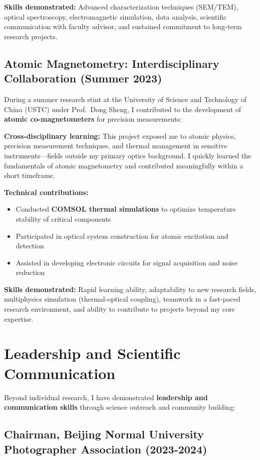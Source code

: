 \documentclass[11pt,a4paper]{article}
\begin{document}
\textbf{Skills demonstrated:} Advanced characterization techniques (SEM/TEM), optical spectroscopy, electromagnetic simulation, data analysis, scientific communication with faculty advisor, and sustained commitment to long-term research projects.

\subsection{Atomic Magnetometry: Interdisciplinary Collaboration (Summer 2023)}

During a summer research stint at the University of Science and Technology of China (USTC) under Prof.~Dong Sheng, I contributed to the development of \textbf{atomic co-magnetometers} for precision measurements:

\textbf{Cross-disciplinary learning:} This project exposed me to atomic physics, precision measurement techniques, and thermal management in sensitive instruments—fields outside my primary optics background. I quickly learned the fundamentals of atomic magnetometry and contributed meaningfully within a short timeframe.

\textbf{Technical contributions:}
\begin{itemize}
    \item Conducted \textbf{COMSOL thermal simulations} to optimize temperature stability of critical components
    \item Participated in optical system construction for atomic excitation and detection
    \item Assisted in developing electronic circuits for signal acquisition and noise reduction
\end{itemize}

\textbf{Skills demonstrated:} Rapid learning ability, adaptability to new research fields, multiphysics simulation (thermal-optical coupling), teamwork in a fast-paced research environment, and ability to contribute to projects beyond my core expertise.

\section{Leadership and Scientific Communication}

Beyond individual research, I have demonstrated \textbf{leadership and communication skills} through science outreach and community building:

\subsection{Chairman, Beijing Normal University Photographer Association (2023-2024)}
\end{document}
